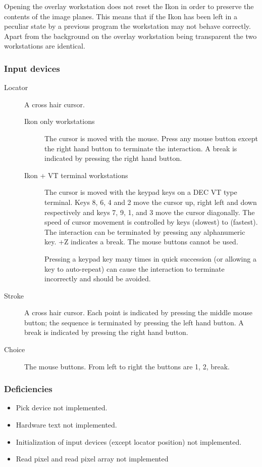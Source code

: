 Opening the overlay workstation does not reset the Ikon in order to preserve
the contents of the image planes.
This means that if the Ikon has been left in a peculiar state by a previous
program the workstation may not behave correctly.
Apart from the background on the overlay workstation being transparent the
two workstations are identical.

\subsubsection{Input devices}
\begin{description}

\item[Locator] A cross hair cursor.
\begin{description}
\item[Ikon only workstations] The cursor is moved with the mouse.
Press any mouse button except the right hand button to terminate 
the interaction. A break is indicated by pressing the right hand button.
\item[Ikon + VT terminal workstations]
The cursor is moved with
the keypad keys on a DEC VT type terminal. Keys 8, 6, 4 and 2 move the cursor
up, right left and down respectively and keys 7, 9, 1, and 3 move the cursor
diagonally. The speed of cursor movement is controlled by keys 
(slowest)
to  (fastest). The interaction can be terminated by pressing any
alphanumeric key. +Z indicates a break. The mouse buttons cannot
be used.

Pressing a keypad key many times in quick succession (or allowing a key to
auto-repeat) can cause the interaction to terminate incorrectly and should
be avoided.

\end{description}
             
\item[Stroke] A cross hair cursor.
Each point is indicated by pressing the middle mouse button; the sequence
is terminated by pressing the left hand button.
A break is indicated by pressing the right hand button.
\item[Choice] The mouse buttons.
From left to right the buttons are 1, 2, break.
\end{description}

\subsubsection{Deficiencies}
\begin{itemize}
\item Pick device not implemented.
\item Hardware text not implemented.
\item Initialization of input devices (except locator position) not implemented.
\item Read pixel and read pixel array not implemented
\end{itemize}

